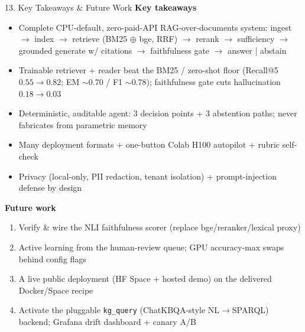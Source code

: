 \documentclass[10pt,aspectratio=169]{beamer}
\begin{document}
\begin{frame}{13. Key Takeaways \& Future Work}
\textbf{Key takeaways}
\begin{itemize}\small
  \item Complete CPU-default, zero-paid-API RAG-over-documents system: ingest $\rightarrow$ index $\rightarrow$ retrieve (BM25 $\oplus$ bge, RRF) $\rightarrow$ rerank $\rightarrow$ sufficiency $\rightarrow$ grounded generate w/ citations $\rightarrow$ faithfulness gate $\rightarrow$ answer | abstain
  \item Trainable retriever + reader beat the BM25 / zero-shot floor (Recall@5 $0.55\!\rightarrow\!0.82$; EM $\sim$0.70 / F1 $\sim$0.78); faithfulness gate cuts hallucination $0.18\!\rightarrow\!0.03$
  \item Deterministic, auditable agent: 3 decision points + 3 abstention paths; never fabricates from parametric memory
  \item Many deployment formats + one-button Colab H100 autopilot + rubric self-check
  \item Privacy (local-only, PII redaction, tenant isolation) + prompt-injection defense by design
\end{itemize}

\textbf{Future work}
\begin{enumerate}\small
  \item Verify \& wire the NLI faithfulness scorer (replace bge/reranker/lexical proxy)
  \item Active learning from the human-review queue; GPU accuracy-max swaps behind config flags
  \item A live public deployment (HF Space + hosted demo) on the delivered Docker/Space recipe
  \item Activate the pluggable \texttt{kg\_query} (ChatKBQA-style NL$\rightarrow$SPARQL) backend; Grafana drift dashboard + canary A/B
\end{enumerate}
\end{frame}
\end{document}

